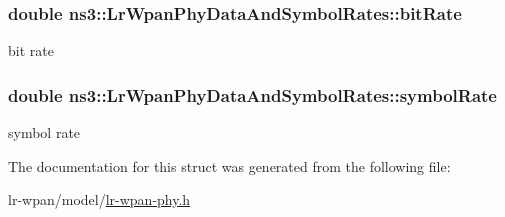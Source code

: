 \subsubsection[{\texorpdfstring{bit\+Rate}{bitRate}}]{\setlength{\rightskip}{0pt plus 5cm}double ns3\+::\+Lr\+Wpan\+Phy\+Data\+And\+Symbol\+Rates\+::bit\+Rate}\hypertarget{structns3_1_1LrWpanPhyDataAndSymbolRates_a47170a3cf10224bb78088f117652d234}{}\label{structns3_1_1LrWpanPhyDataAndSymbolRates_a47170a3cf10224bb78088f117652d234}


bit rate 

\subsubsection[{\texorpdfstring{symbol\+Rate}{symbolRate}}]{\setlength{\rightskip}{0pt plus 5cm}double ns3\+::\+Lr\+Wpan\+Phy\+Data\+And\+Symbol\+Rates\+::symbol\+Rate}\hypertarget{structns3_1_1LrWpanPhyDataAndSymbolRates_a2670dd2cbf31f676ecd8676c74d85cc4}{}\label{structns3_1_1LrWpanPhyDataAndSymbolRates_a2670dd2cbf31f676ecd8676c74d85cc4}


symbol rate 



The documentation for this struct was generated from the following file\+:\begin{DoxyCompactItemize}
\item 
lr-\/wpan/model/\hyperlink{lr-wpan-phy_8h}{lr-\/wpan-\/phy.\+h}\end{DoxyCompactItemize}
